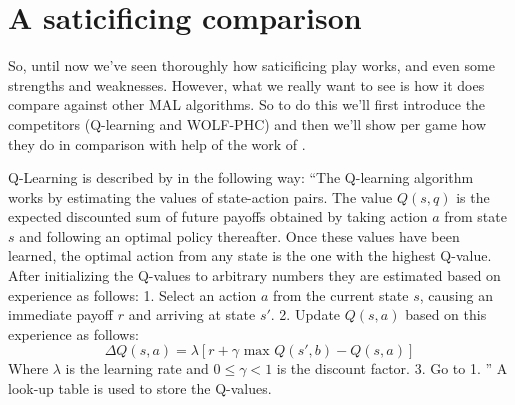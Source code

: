 \noindent
{}

\section{A saticificing comparison}
\toReview So, until now we've seen thoroughly how saticificing play works, and even some
strengths and weaknesses. However, what we really want to see is how it does
compare against other MAL algorithms. So to do this we'll first introduce the
competitors (Q-learning and WOLF-PHC) and then we'll show per game how they
do in comparison with help of the work of \citep{crandall}.

Q-Learning is described by \citep{sandholm} in the following way: ``The
Q-learning algorithm works by estimating the values of state-action pairs. The
value $Q(s,q)$ is the expected discounted sum of future payoffs obtained by taking
action $a$ from state $s$ and following an optimal policy thereafter.
Once these values have been learned, the optimal action from any state
is the one with the highest Q-value. After initializing the Q-values to arbitrary
numbers they are estimated based on experience as follows: 1. Select an action
$a$ from the current state $s$, causing an immediate payoff $r$ and arriving at
state $s'$. 2. Update $Q(s,a)$ based on this experience as follows:
\[\Delta Q(s,a) = \lambda[r+\gamma \text{ max }Q(s',b)-Q(s,a)]\]
Where $\lambda$ is the learning rate and $0 \leq \gamma < 1$ is the discount
factor.
3. Go to 1.
'' A look-up table is used to store the Q-values.

